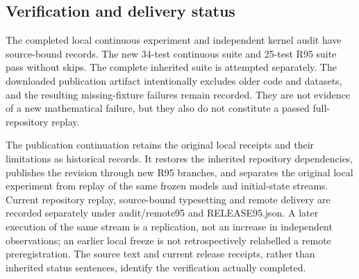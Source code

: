 \hypertarget{verification-and-delivery-status}{%
\subsection{Verification and delivery
status}\label{verification-and-delivery-status}}

The completed local continuous experiment and independent kernel audit
have source-bound records. The new 34-test continuous suite and 25-test
R95 suite pass without skips. The complete inherited suite is attempted
separately. The downloaded publication artifact intentionally excludes
older code and datasets, and the resulting missing-fixture failures
remain recorded. They are not evidence of a new mathematical failure,
but they also do not constitute a passed full-repository replay.

The publication continuation retains the original local receipts and
their limitations as historical records. It restores the inherited
repository dependencies, publishes the revision through new R95
branches, and separates the original local experiment from replay of the
same frozen models and initial-state streams. Current repository replay,
source-bound typesetting and remote delivery are recorded separately
under audit/remote95 and RELEASE95.json. A later execution of the same
stream is a replication, not an increase in independent observations; an
earlier local freeze is not retrospectively relabelled a remote
preregistration. The source text and current release receipts, rather
than inherited status sentences, identify the verification actually
completed.
